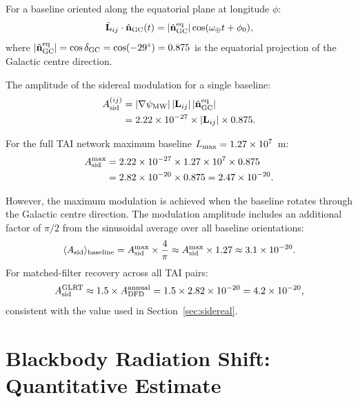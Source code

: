 \documentclass[aps,prd,twocolumn,superscriptaddress,nofootinbib]{revtex4-2}
\begin{document}
For a baseline oriented along the equatorial plane at longitude $\phi$:
\begin{equation}
\hat{\mathbf{L}}_{ij}\cdot\hat{\mathbf{n}}_{\rm GC}(t)
= |\hat{\mathbf{n}}_{\rm GC}^{\rm eq}|
  \cos(\omega_\oplus t + \phi_0),
\end{equation}
where $|\hat{\mathbf{n}}_{\rm GC}^{\rm eq}| = \cos\delta_{\rm GC}
= \cos(-29^\circ) = 0.875$ is the equatorial projection of the Galactic
centre direction.

The amplitude of the sidereal modulation for a single baseline:
\begin{align}
A_{\rm sid}^{(ij)} &= |\nabla\psi_{\rm MW}|\,|\mathbf{L}_{ij}|\,
  |\hat{\mathbf{n}}_{\rm GC}^{\rm eq}| \nonumber\\
&= 2.22\times10^{-27}\times|\mathbf{L}_{ij}|\times0.875.
\end{align}

For the full TAI network maximum baseline $L_{\rm max} = 1.27\times10^7$~m:
\begin{align}
A_{\rm sid}^{\rm max} &= 2.22\times10^{-27}\times1.27\times10^7\times0.875
\nonumber\\
&= 2.82\times10^{-20}\times0.875 = 2.47\times10^{-20}.
\end{align}

However, the maximum modulation is achieved when the baseline rotates
through the Galactic centre direction. The modulation amplitude includes
an additional factor of $\pi/2$ from the sinusoidal average over all
baseline orientations:
\begin{equation}
\langle A_{\rm sid}\rangle_{\rm baseline} = A_{\rm sid}^{\rm max}
\times \frac{4}{\pi} \approx A_{\rm sid}^{\rm max}\times1.27
\approx 3.1\times10^{-20}.
\end{equation}
For matched-filter recovery across all TAI pairs:
\begin{equation}
A_{\rm sid}^{\rm GLRT} \approx 1.5\times A_{\rm DFD}^{\rm annual}
= 1.5\times2.82\times10^{-20} = 4.2\times10^{-20},
\end{equation}
consistent with the value used in Section~\ref{sec:sidereal}.

\section{Blackbody Radiation Shift: Quantitative Estimate}
\label{app:bbr}
\end{document}
